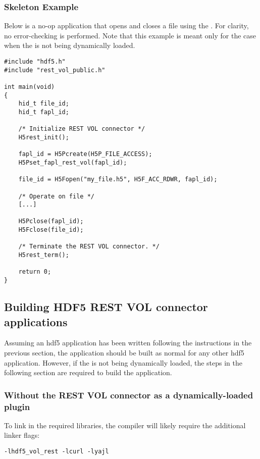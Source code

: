 \documentclass[../users_guide.tex]{subfiles}
\begin{document}
\subsubsection{Skeleton Example}

Below is a no-op application that opens and closes a file using the \rvc{}.
For clarity, no error-checking is performed. Note that this example is
meant only for the case when the \rvc{} is not being dynamically loaded.

\begin{verbatim}
#include "hdf5.h"
#include "rest_vol_public.h"

int main(void)
{
    hid_t file_id;
    hid_t fapl_id;

    /* Initialize REST VOL connector */
    H5rest_init();

    fapl_id = H5Pcreate(H5P_FILE_ACCESS);
    H5Pset_fapl_rest_vol(fapl_id); 

    file_id = H5Fopen("my_file.h5", H5F_ACC_RDWR, fapl_id);

    /* Operate on file */
    [...]

    H5Pclose(fapl_id);
    H5Fclose(file_id);

    /* Terminate the REST VOL connector. */
    H5rest_term();

    return 0;
}
\end{verbatim}

\subsection{Building HDF5 REST VOL connector applications}

Assuming an \acrshort{hdf5} application has been written following the instructions in the previous
section, the application should be built as normal for any other \acrshort{hdf5} application. However,
if the \rvc{} is not being dynamically loaded, the steps in the following section are required to
build the application.

\subsubsection{Without the REST VOL connector as a dynamically-loaded plugin}

To link in the required libraries, the compiler will likely require the
additional linker flags:

\begin{verbatim}
-lhdf5_vol_rest -lcurl -lyajl
\end{verbatim}
\end{document}

